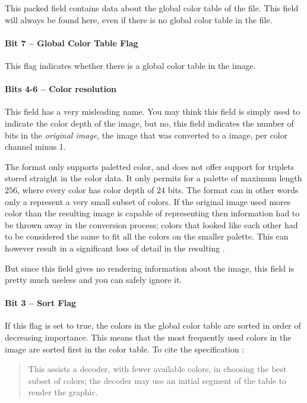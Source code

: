 This packed field contains data about the global color table of the
file. This field will always be found here, even if there is no global
color table in the file.

\paragraph{Bit 7 --  Global Color Table Flag}

This flag indicates whether there is a global color table in the
image.

\paragraph{Bits 4-6 -- Color resolution}

This field has a very misleading name. You may think this field is
simply used to indicate the color depth of the image, but no, this
field indicates the number of bits in the \textit{original image}, the
image that was converted to a \gif image, per color channel minus 1.

The \gif format only supports paletted color, and does not offer support
for \rgb triplets stored straight in the color data. It only permits
for a palette of maximum length $256$, where every color has color
depth of $24$ bits. The \gif format can in other words only a represent
a very small subset of colors. If the original image used mores color
than the resulting \gif image is capable of representing then
information had to be thrown away in the conversion process; colors
that looked like each other had to be considered the same to fit all
the colors on the smaller palette. This can however result in a
significant loss of detail in the resulting \gif.

But since this field gives no rendering information about the image,
this field is pretty much useless and you can safely ignore it.

\paragraph{Bit 3 -- Sort Flag}

If this flag is set to true, the colors in the global color table are
sorted in order of decreasing importance. This means that the most
frequently used colors in the image are sorted first in the color
table. To cite the \gif specification \cite{gif89a}:

\begin{quote}
  This assists a decoder, with fewer available colors, in choosing
  the best subset of colors; the decoder may use an initial segment
  of the table to render the graphic.
\end{quote}


